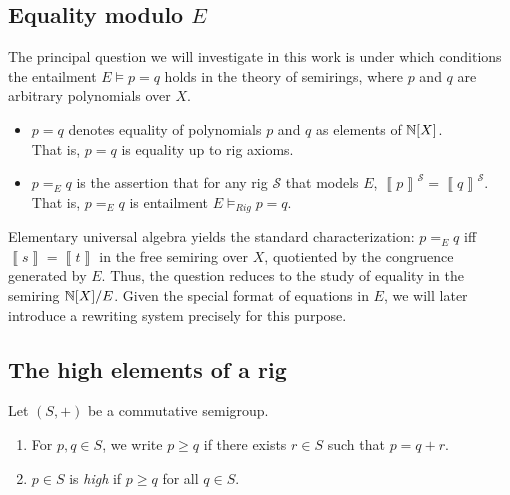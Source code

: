 \documentclass[numbers=enddot]{scrartcl}
\newcommand{\mcS}{\mathcal{S}}
\newcommand{\semof}[1]{{\left\llbracket{#1}\right\rrbracket}}
\begin{document}
\subsection{Equality modulo $E$}
The principal question we will investigate in this work is under which conditions
the entailment $E \models p = q$ holds in the theory of semirings, where
$p$ and $q$ are arbitrary polynomials over $X$.

\begin{notn} \hfill
  \begin{itemize}

  \item $p=q$ denotes equality of polynomials $p$ and $q$ as elements of
  $\mathbb{N}[X]$.\\
  That is, $p = q$ is equality up to rig axioms.

  \item $p=_E q$ is the assertion that for any rig
  $\mcS$ that models $E$, $\semof{p}^\mcS = \semof{q}^\mcS$.\\
  That is, $p =_E q$ is entailment $E \models_{Rig} p=q$.
\end{itemize}
\end{notn}

Elementary universal algebra yields the standard characterization:
$p =_E q$ iff $\semof{s} = \semof{t}$ in the free semiring over $X$,
quotiented by the congruence generated by $E$.  Thus, the question reduces to the
study of equality in the semiring $\mathbb{N}[X]/E$. Given the special format of
equations in $E$, we will later introduce a rewriting system precisely for this purpose.

\subsection{The high elements of a rig}

\begin{dfn} 
  Let $(S,+)$ be a commutative semigroup. 
  \begin{enumerate}
    \item For $p,q \in S$, we write $p \ge q$ if there exists $r \in S$ such that $p = q + r$.
    \item $p \in S$ is \emph{high} if $p \ge q$ for all $q \in S$.
  \end{enumerate}
\end{dfn}
\end{document}
